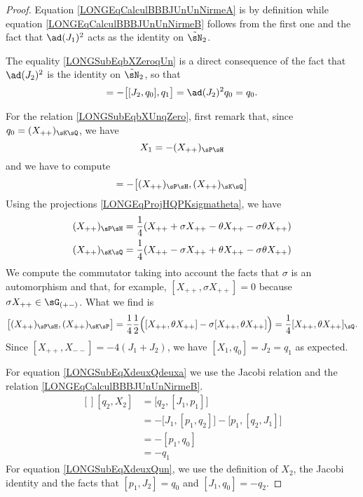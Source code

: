 \begin{proof}


	Equation \eqref{LONGEqCalculBBBJUnUnNirmeA} is by definition while equation \eqref{LONGEqCalculBBBJUnUnNirmeB} follows from the first one and the fact that $\ad(J_1)^2$ acts as the identity on $\tilde\sN_2$.

	The equality \eqref{LONGSubEqbXZeroqUn} is a direct consequence of the fact that $\ad(J_2)^2$ is the identity on $\tilde\sN_2$, so that
	\begin{equation}
		[X_1,q_1]=-\big[ [J_2,q_0],q_1 \big]=\ad(J_2)^2q_0=q_0.
	\end{equation}

	For the relation \eqref{LONGSubEqbXUnqZero}, first remark that, since $q_0=(X_{++})_{\sK\sQ}$, we have
	\begin{equation}
		X_1=-(X_{++})_{\sP\sH}
	\end{equation}
	and we have to compute
	\begin{equation}
		[X_1,q_0]=-\big[ (X_{++})_{\sP\sH},(X_{++})_{\sK\sQ} \big]
	\end{equation}
	Using the projections \eqref{LONGEqProjHQPKsigmatheta}, we have
	\begin{equation}
		\begin{aligned}[]
			(X_{++})_{\sP\sH} & =\frac{1}{ 4 }(X_{++}+\sigma X_{++}-\theta X_{++}-\sigma\theta X_{++}) \\
			(X_{++})_{\sK\sQ} & =\frac{1}{ 4 }(X_{++}-\sigma X_{++}+\theta X_{++}-\sigma\theta X_{++})
		\end{aligned}
	\end{equation}
	We compute the commutator taking into account the facts that $\sigma$ is an automorphism and that, for example, $[X_{++},\sigma X_{++}]=0$ because $\sigma X_{++}\in\sG_{(+-)}$. What we find is
	\begin{equation}
		\big[ (X_{++})_{\sP\sH},(X_{++})_{\sK\sP} \big]=\frac{1}{ 4 }\frac{ 1 }{2}\Big( [X_{++},\theta X_{++}]-\sigma [X_{++},\theta X_{++}] \Big)=\frac{1}{ 4 }[X_{++},\theta X_{++}]_{\sQ}.
	\end{equation}
	Since $[X_{++},X_{--}]=-4(J_1+J_2)$, we have $[X_1,q_0]=J_2=q_1$ as expected.


	For equation \eqref{LONGSubEqXdeuxQdeuxa} we use the Jacobi relation and the relation \eqref{LONGEqCalculBBBJUnUnNirmeB}.
	\begin{equation}
		\begin{aligned}[]
			[q_2,X_2] & =\big[ q_2,[J_1,p_1] \big]                            \\
			          & =-\big[ J_1,[p_1,q_2] \big]-\big[ p_1,[q_2,J_1] \big] \\
			          & =-[p_1,q_0]                                           \\
			          & =-q_1
		\end{aligned}
	\end{equation}
	For equation \eqref{LONGSubEqXdeuxQun}, we use the definition of $X_2$, the Jacobi identity and the facts that $[p_1,J_2]=q_0$ and $[J_1,q_0]=-q_2$.


\end{proof}
